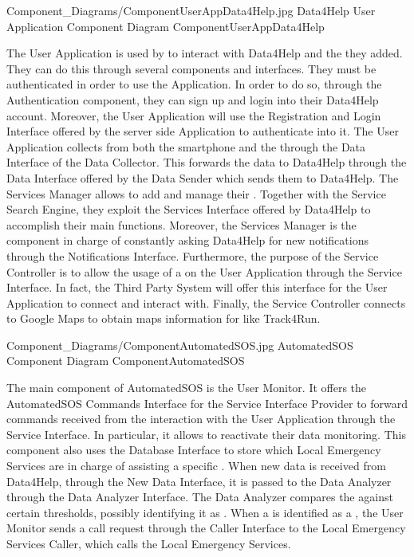 \documentclass[../../DD.tex]{subfiles}
\begin{document}
	\image {13cm} {Component_Diagrams/ComponentUserAppData4Help.jpg} {Data4Help User Application Component Diagram} {ComponentUserAppData4Help}

	The User Application is used by  to interact with Data4Help and the  they added. They can do this through several components and interfaces. They must be authenticated in order to use the Application. In order to do so, through the Authentication component, they can sign up and login into their Data4Help account. Moreover, the User Application will use the Registration and Login Interface offered by the server side Application to authenticate into it.
	The User Application collects  from both the smartphone and the  through the Data Interface of the Data Collector. This forwards the data to Data4Help through the Data Interface offered by the Data Sender which sends them to Data4Help.
	The Services Manager allows  to add and manage their . Together with the Service Search Engine, they exploit the Services Interface offered by Data4Help to accomplish their main functions. Moreover, the Services Manager is the component in charge of constantly asking Data4Help for new notifications through the Notifications Interface.
	Furthermore, the purpose of the Service Controller is to allow the usage of a  on the User Application through the Service Interface. In fact, the Third Party System will offer this interface for the User Application to connect and interact with. Finally, the Service Controller connects to Google Maps to obtain maps information for  like Track4Run.

	\image {13cm} {Component_Diagrams/ComponentAutomatedSOS.jpg} {AutomatedSOS Component Diagram} {ComponentAutomatedSOS}

	The main component of AutomatedSOS is the User Monitor. It offers the AutomatedSOS Commands Interface for the Service Interface Provider to forward commands received from the interaction with the User Application through the Service Interface. In particular, it allows  to reactivate their data monitoring. This component also uses the Database Interface to store which Local Emergency Services are in charge of assisting a specific .
	When new data is received from Data4Help, through the New Data Interface, it is passed to the Data Analyzer through the Data Analyzer Interface. The Data Analyzer compares the  against certain thresholds, possibly identifying it as . When a  is identified as a , the User Monitor sends a call request through the Caller Interface to the Local Emergency Services Caller, which calls the Local Emergency Services.
\end{document}
